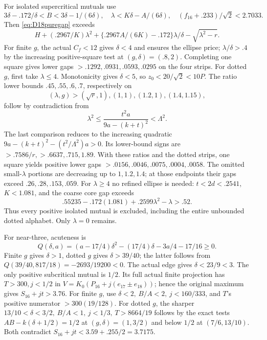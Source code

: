 \documentclass[11pt]{article}
\theoremstyle{definition}
\theoremstyle{remark}
\begin{document}
For isolated supercritical mutuals use
\[
 3\delta-.172/\delta<B<3\delta-1/(6\delta),\quad
 \lambda<K\delta-A/(6\delta),\quad
 (f_{16}+.233)/\sqrt2<2.7033.
\]
Then \eqref{eq:D18puregap} exceeds
\[
 H+(.2967/K)\lambda^2+
 \{.2967A/(6K)-.172\}\lambda/\delta-\sqrt{\lambda^2-r}.
\]
For finite \(g\), the actual \(C_f<12\) gives \(\delta<4\)
and ensures the ellipse price; \(\lambda/\delta>.4\)
by the increasing positive-square test at \((g,\delta)=(.8,2)\).
Completing one square gives lower gaps
\(>.1292,.0931,.0593,.0295\) on the four strips.
For dotted \(g\), first take \(\lambda\leq4\).
Monotonicity gives \(\delta<5\), so
\(z_0<20/\sqrt2<10P\).
The ratio lower bounds \(.45,.55,.6,.7\), respectively on
\[
 (\lambda,g)>(\sqrt r,1),(1,1),(1.2,1),(1.4,1.15),
\]
follow by contradiction from
\[
 \lambda^2\leq \frac{t^2a}{9a-(k+t)^2}<\Lambda^2 .
\]
The last comparison reduces to the increasing quadratic
\(9a-(k+t)^2-(t^2/\Lambda^2)a>0\).
Its lower-bound signs are \(>.7586/r,>.6637,.715,1.89\).
With these ratios and the dotted strips, one square yields positive
lower gaps \(>.0156,.0046,.0075,.0004,.0058\).
The omitted small-\(\lambda\) portions are decreasing up to
\(1,1.2,1.4\); at those endpoints their gaps exceed
\(.26,.28,.153,.059\).
For \(\lambda\geq4\) no refined ellipse is needed:
\(t<2d<.2541\), \(K<1.081\), and the coarse core gap exceeds
\[
 .55235-.172(1.081)+.2599\lambda^2-\lambda>.52 .
\]
Thus every positive isolated mutual is excluded, including the entire
unbounded dotted alphabet. Only \(\lambda=0\) remains.

For near-three, acuteness is
\[
 Q(\delta,a)=(a-17/4)\delta^2-(17/4)\delta-3a/4-17/16\geq0 .
\]
Finite \(g\) gives \(\delta>1\), dotted \(g\) gives
\(\delta>39/40\); the latter follows from
\(Q(39/40,817/18)=-2693/19200<0\).
The actual edge gives \(\delta<23/9<3\).
The only positive subcritical mutual is \(1/2\).
Its full actual finite projection has \(T>300,j<1/2\) in
\(V=K_0(P_{16}+j(e_{17}\pm e_{18}))\);
hence the original maximum gives \(S_{16}+jt>3.76\).
For finite \(g\), use \(\delta<2,\ B/A<2,\ j<160/333\),
and \(T\)'s positive numerator \(>300(19/128)\).
For dotted \(g\), the sharper
\(13/10<\delta<3/2,\ B/A<1,\ j<1/3,\ T>8664/19\)
follows by the exact tests
\(A B-k(\delta+1/2)=1/2\) at \((g,\delta)=(1,3/2)\)
and below \(1/2\) at \((7/6,13/10)\).
Both contradict \(S_{16}+jt<3.59+.255/2=3.7175\).
\end{document}
